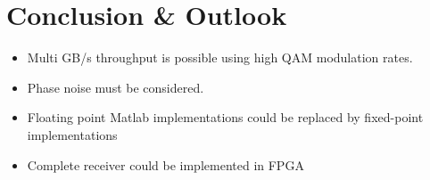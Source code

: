 \chapter{Conclusion \& Outlook}
\begin{itemize}
\item Multi GB/s throughput is possible using high QAM modulation rates.
\item Phase noise must be considered.
\item Floating point Matlab implementations could be replaced by fixed-point implementations
\item Complete receiver could be implemented in FPGA
\end{itemize}
